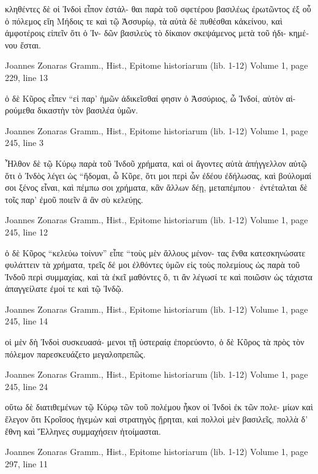 \documentclass[12pt,letterpaper,twoside,final]{memoir}
\begin{document}
\begin{greek}
                   κληθέντες δὲ οἱ Ἰνδοὶ εἶπον ἐστάλ-
θαι παρὰ τοῦ σφετέρου βασιλέως ἐρωτῶντος ἐξ οὗ ὁ 
πόλεμος εἴη Μήδοις τε καὶ τῷ Ἀσσυρίῳ, τὰ αὐτὰ δὲ 
πυθέσθαι κἀκείνου, καὶ ἀμφοτέροις εἰπεῖν ὅτι ὁ Ἰν-
δῶν βασιλεὺς τὸ δίκαιον σκεψάμενος μετὰ τοῦ ἠδι-
κημένου ἔσται. 



Joannes Zonaras Gramm., Hist., Epitome historiarum (lib. 1-12) 
Volume 1, page 229, line 13

                     ὁ δὲ Κῦρος εἶπεν “εἰ παρ' ἡμῶν 
ἀδικεῖσθαί φησιν ὁ Ἀσσύριος, ὦ Ἰνδοί, αὐτὸν αἱ-
ρούμεθα δικαστὴν τὸν βασιλέα ὑμῶν. 



Joannes Zonaras Gramm., Hist., Epitome historiarum (lib. 1-12) 
Volume 1, page 245, line 3

Ἦλθον δὲ τῷ Κύρῳ παρὰ τοῦ Ἰνδοῦ χρήματα, 
καὶ οἱ ἄγοντες αὐτὰ ἀπήγγελλον αὐτῷ ὅτι ὁ Ἰνδὸς 
λέγει ὡς “ἥδομαι, ὦ Κῦρε, ὅτι μοι περὶ ὧν ἐδέου 
ἐδήλωσας, καὶ βούλομαί σοι ξένος εἶναι, καὶ πέμπω 
σοι χρήματα, κἂν ἄλλων δέῃ, μεταπέμπου· ἐντέταλται 
δὲ τοῖς παρ' ἐμοῦ ποιεῖν ἃ ἂν σὺ κελεύῃς. 



Joannes Zonaras Gramm., Hist., Epitome historiarum (lib. 1-12) 
Volume 1, page 245, line 12

                                                       ὁ δὲ 
Κῦρος “κελεύω τοίνυν” εἶπε “τοὺς μὲν ἄλλους μένον-
τας ἔνθα κατεσκηνώσατε φυλάττειν τὰ χρήματα, τρεῖς 
δέ μοι ἐλθόντες ὑμῶν εἰς τοὺς πολεμίους ὡς παρὰ 
τοῦ Ἰνδοῦ περὶ συμμαχίας, καὶ τὰ ἐκεῖ μαθόντες ὅ, 
τι ἂν λέγωσί τε καὶ ποιῶσιν ὡς τάχιστα ἀπαγγείλατε 
ἐμοί τε καὶ τῷ Ἰνδῷ. 



Joannes Zonaras Gramm., Hist., Epitome historiarum (lib. 1-12) 
Volume 1, page 245, line 14

                               οἱ μὲν δὴ Ἰνδοὶ συσκευασά-
μενοι τῇ ὑστεραίᾳ ἐπορεύοντο, ὁ δὲ Κῦρος τὰ πρὸς 
τὸν πόλεμον παρεσκευάζετο μεγαλοπρεπῶς. 



Joannes Zonaras Gramm., Hist., Epitome historiarum (lib. 1-12) 
Volume 1, page 245, line 24

                              οὕτω δὲ διατιθεμένων τῷ 
Κύρῳ τῶν τοῦ πολέμου ἧκον οἱ Ἰνδοὶ ἐκ τῶν πολε-
μίων καὶ ἔλεγον ὅτι Κροῖσος ἡγεμὼν καὶ στρατηγὸς 
ᾕρηται, καὶ πολλοὶ μὲν βασιλεῖς, πολλὰ δ' ἔθνη καὶ 
Ἕλληνες συμμαχήσειν ἡτοίμασται. 



Joannes Zonaras Gramm., Hist., Epitome historiarum (lib. 1-12) 
Volume 1, page 297, line 11


\end{greek}
\end{document}
